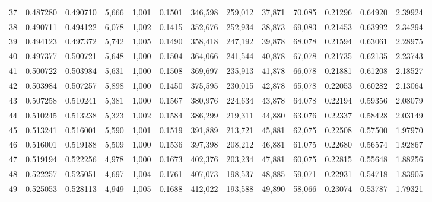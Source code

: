 \begin{tabular}{rrrrrrrrrrrrr}
37  &  0.487280 &  0.490710 &   5,666 &  1,001 &                                     0.1501 &  346,598 &  259,012 &   37,871 &   70,085 &  0.21296 &  0.64920 &  2.39924 \\
38  &  0.490711 &  0.494122 &   6,078 &  1,002 &                                     0.1415 &  352,676 &  252,934 &   38,873 &   69,083 &  0.21453 &  0.63992 &  2.34294 \\
39  &  0.494123 &  0.497372 &   5,742 &  1,005 &                                     0.1490 &  358,418 &  247,192 &   39,878 &   68,078 &  0.21594 &  0.63061 &  2.28975 \\
40  &  0.497377 &  0.500721 &   5,648 &  1,000 &                                     0.1504 &  364,066 &  241,544 &   40,878 &   67,078 &  0.21735 &  0.62135 &  2.23743 \\
41  &  0.500722 &  0.503984 &   5,631 &  1,000 &                                     0.1508 &  369,697 &  235,913 &   41,878 &   66,078 &  0.21881 &  0.61208 &  2.18527 \\
42  &  0.503984 &  0.507257 &   5,898 &  1,000 &                                     0.1450 &  375,595 &  230,015 &   42,878 &   65,078 &  0.22053 &  0.60282 &  2.13064 \\
43  &  0.507258 &  0.510241 &   5,381 &  1,000 &                                     0.1567 &  380,976 &  224,634 &   43,878 &   64,078 &  0.22194 &  0.59356 &  2.08079 \\
44  &  0.510245 &  0.513238 &   5,323 &  1,002 &                                     0.1584 &  386,299 &  219,311 &   44,880 &   63,076 &  0.22337 &  0.58428 &  2.03149 \\
45  &  0.513241 &  0.516001 &   5,590 &  1,001 &                                     0.1519 &  391,889 &  213,721 &   45,881 &   62,075 &  0.22508 &  0.57500 &  1.97970 \\
46  &  0.516001 &  0.519188 &   5,509 &  1,000 &                                     0.1536 &  397,398 &  208,212 &   46,881 &   61,075 &  0.22680 &  0.56574 &  1.92867 \\
47  &  0.519194 &  0.522256 &   4,978 &  1,000 &                                     0.1673 &  402,376 &  203,234 &   47,881 &   60,075 &  0.22815 &  0.55648 &  1.88256 \\
48  &  0.522257 &  0.525051 &   4,697 &  1,004 &                                     0.1761 &  407,073 &  198,537 &   48,885 &   59,071 &  0.22931 &  0.54718 &  1.83905 \\
49  &  0.525053 &  0.528113 &   4,949 &  1,005 &                                     0.1688 &  412,022 &  193,588 &   49,890 &   58,066 &  0.23074 &  0.53787 &  1.79321 \\

\end{tabular}
